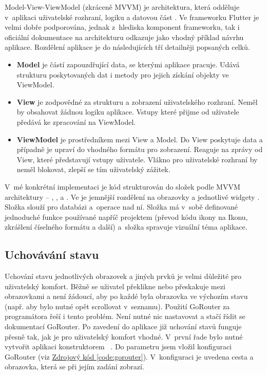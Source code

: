 \documentclass[
  biblatex,
  figures=true,
  tables=false,
  glossaries,
  index
]{kidiplom}
\begin{document}
Model-View-ViewModel (zkráceně MVVM) je architektura, která odděluje v~aplikaci uživatelské rozhraní, logiku a datovou část \cite{mvvm}. Ve frameworku Flutter je velmi dobře podporována, jednak z~hlediska komponent frameworku, tak i oficiální dokumentace na architekturu odkazuje jako vhodný příklad návrhu aplikace. Rozdělení aplikace je do následujících tří detailněji popsaných celků.
\begin{itemize}
  \item \textbf{Model} je částí zapouzdřující data, se kterými aplikace pracuje. Udává strukturu poskytovaných dat i metody pro jejich získání objekty ve ViewModel.
  \item \textbf{View} je zodpovědné za strukturu a zobrazení uživatelského rozhraní. Neměl by obsahovat žádnou logiku aplikace. Vstupy které přijme od uživatele předává ke zpracování na ViewModel. 
  \item \textbf{ViewModel} je prostředníkem mezi View a Model. Do View poskytuje data a případně je upraví do vhodného formátu pro zobrazení. Reaguje na zprávy od View, které představují vstupy uživatele. Vlákno pro uživatelské rozhraní by neměl blokovat, zlepší se tím uživatelský zážitek.
\end{itemize}

V~mé konkrétní implementaci je kód strukturován do složek podle MVVM architektury -- , ,  a . Ve  je jemnější rozdělení na obrazovky  a jednotlivé widgety . Složka  slouží pro databázi a~operace nad ní. Složka  má v~sobě definované jednoduché funkce používané napříč projektem (převod kódu ikony na Ikonu, zkrášlení číselného formátu a další) a~složka  spravuje vizuální téma aplikace.

\subsection{Uchovávání stavu}
Uchování stavu jednotlivých obrazovek a jiných prvků je velmi důležité pro uživatelský komfort. Běžně se uživatel překlikne nebo přeskakuje mezi obrazovkami a není žádoucí, aby po každé byla obrazovka ve výchozím stavu (např. aby bylo nutné opět scrollovat v~seznamu). Použití GoRouter za programátora řeší i tento problém. Není nutné nic nastavovat a stačí řídit se dokumentací GoRouter. Po zavedení do aplikace již uchování stavů funguje přesně tak, jak je pro uživatelský komfort vhodné. V~první řade bylo nutné vytvořit aplikaci konstruktorem ~. Do parametru  jsem vložil konfiguraci GoRouter (viz \hyperref[code:gorouter]{Zdrojový kód \ref{code:gorouter}}). V~konfiguraci je uvedena cesta a obrazovka, která se při jejím zadání zobrazí.
\end{document}
